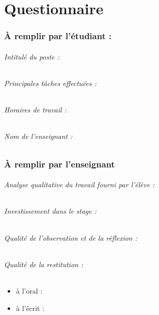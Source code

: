 \documentclass{enpc-ippex}
\begin{document}
\pagebreak

\part*{Questionnaire}

\section*{À remplir par l’étudiant :}

\paragraph{Intitulé du poste :}

\paragraph{Principales tâches effectuées :}

\paragraph{Horaires de travail :}

\paragraph{Nom de l’enseignant :}

\section*{À remplir par l’enseignant}


\paragraph{Analyse qualitative du travail fourni par l’élève :}

\paragraph{Investissement dans le stage :}
\vspace{1.5cm}

\paragraph{Qualité de l’observation et de la réflexion :}
\vspace{1.5cm}

\paragraph{Qualité de la restitution :}
\vspace{1.5cm}

\begin{itemize}
    \item à l’oral :
    \vspace{1.5cm}
    \item à l’écrit :
    \vspace{1.5cm}
\end{itemize}

\end{document}
